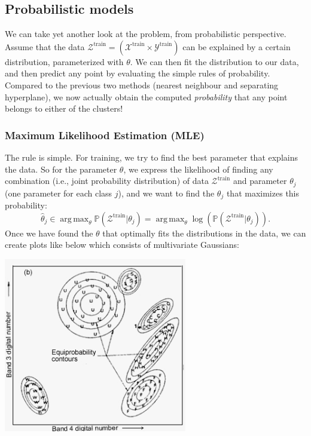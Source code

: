 \documentclass{article}
\DeclareMathOperator*{\argmax}{arg\,max}
\begin{document}
\newpage
\subsection{Probabilistic models}
We can take yet another look at the problem, from probabilistic perspective. Assume that the data $\mathcal{Z}^\text{train}=(\mathcal{X}^\text{train}\times\mathcal{Y}^\text{train})$ can be explained by a certain distribution, parameterized with $\theta$. We can then fit the distribution to our data, and then predict any point by evaluating the simple rules of probability. Compared to the previous two methods (nearest neighbour and separating hyperplane), we now actually obtain the computed \textit{probability} that any point belongs to either of the clusters!

\subsubsection{Maximum Likelihood Estimation (MLE)}
The rule is simple. For training, we try to find the best parameter that explains the data. So for the parameter $\theta$, we express the likelihood of finding any combination (i.e., joint probability distribution) of data $\mathcal{Z}^\text{train}$ and parameter $\theta_j$ (one parameter for each class $j$), and we want to find the $\theta_j$ that maximizes this probability:
\begin{equation}
    \hat{\theta}_j\in\argmax_\theta \mathbb{P}(\mathcal{Z}^\text{train}|\theta_j) = \argmax_\theta \log\left( \mathbb{P}(\mathcal{Z}^\text{train}|\theta_j) \right).
\end{equation}
Once we have found the $\theta$ that optimally fits the distributions in the data, we can create plots like below which consists of multivariate Gaussians:
\begin{center}
    \includegraphics[width=0.6\textwidth,trim={0.5cm 0.35cm 0 0},clip]{MLE_class.jpg}
\end{center}
\end{document}

